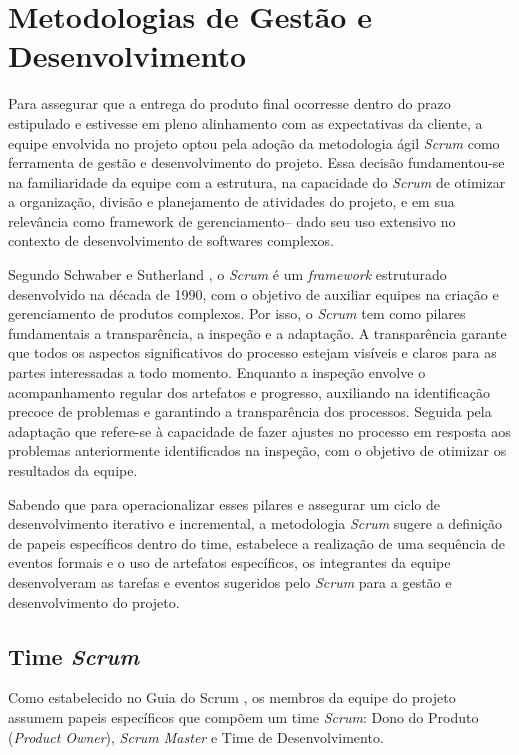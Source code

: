 \documentclass[
	12pt,				%
	openany,			%
	twoside,			%
	a4paper,			%
	english,			%
	french,				%
	spanish,			%
	brazil				%
	]{abntex2}
\begin{document}
\section{Metodologias de Gestão e Desenvolvimento}
Para assegurar que a entrega do produto final ocorresse dentro do prazo estipulado e estivesse em pleno alinhamento com as expectativas da cliente, a equipe envolvida no projeto optou pela adoção da metodologia ágil \textit{Scrum} como ferramenta de gestão e desenvolvimento do projeto. Essa decisão fundamentou-se na familiaridade da equipe com a estrutura, na capacidade do \textit{Scrum} de otimizar a organização, divisão e planejamento de atividades do projeto, e em sua relevância como framework de gerenciamento– dado seu uso extensivo no contexto de desenvolvimento de softwares complexos.

Segundo Schwaber e Sutherland \cite{scrumguide}, o \textit{Scrum} é um \textit{framework} estruturado desenvolvido na década de 1990, com o objetivo de auxiliar equipes na criação e gerenciamento de produtos complexos. Por isso,  o \textit{Scrum} tem como pilares fundamentais a transparência, a inspeção e a adaptação. A transparência garante que todos os aspectos significativos do processo estejam visíveis e claros para as partes interessadas a todo momento. Enquanto a inspeção envolve o acompanhamento regular dos artefatos e progresso, auxiliando na identificação precoce de problemas e garantindo a transparência dos processos. Seguida pela adaptação que refere-se à capacidade de fazer ajustes no processo  em resposta aos problemas anteriormente identificados na inspeção, com o objetivo de otimizar os resultados da equipe.

Sabendo que para operacionalizar esses pilares e assegurar um ciclo de desenvolvimento iterativo e incremental, a metodologia \textit{Scrum} sugere a definição de papeis específicos dentro do time, estabelece a realização de uma sequência de eventos formais e o uso de artefatos específicos, os integrantes da equipe desenvolveram as tarefas e eventos sugeridos pelo \textit{Scrum} para a gestão e desenvolvimento do projeto.

\subsection{Time \textit{Scrum}}
Como estabelecido no Guia do Scrum \cite{scrumguide}, os membros da equipe do projeto assumem papeis específicos que compõem um time \textit{Scrum}: Dono do Produto (\textit{Product Owner}), \textit{Scrum Master} e Time de Desenvolvimento. 
\end{document}
